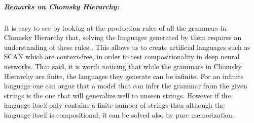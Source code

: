 \subparagraph{Remarks on Chomsky Hierarchy:}It is easy to see by looking at the production rules of all the grammars in Chomsky Hierarchy that, solving the languages generated by them requires an understanding of these rules . This allows us to create artificial languages such as SCAN \citep{Lake2017} which are context-free, in order to test compositionality in deep neural networks. That said, it is worth noticing that while the grammars in Chomsky Hierarchy are finite, the languages they generate can be infinite. For an infinite language one can argue that a model that can infer the grammar from the given strings is the one that will generalize well to unseen strings. However if the language itself only contains a finite number of strings then although the language itself is compositional, it can be solved also by pure memorization.
